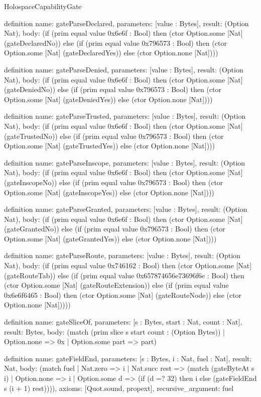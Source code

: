 \begin{lexlean}{HolospaceCapabilityGate}
\begin{semanticmodule}
definition{
  name: gateParseDeclared,
  parameters: [value : Bytes],
  result: (Option Nat),
  body: (if (prim equal value 0x6e6f : Bool) then (ctor Option.some [Nat] (gateDeclaredNo)) else (if (prim equal value 0x796573 : Bool) then (ctor Option.some [Nat] (gateDeclaredYes)) else (ctor Option.none [Nat])))
}

definition{
  name: gateParseDenied,
  parameters: [value : Bytes],
  result: (Option Nat),
  body: (if (prim equal value 0x6e6f : Bool) then (ctor Option.some [Nat] (gateDeniedNo)) else (if (prim equal value 0x796573 : Bool) then (ctor Option.some [Nat] (gateDeniedYes)) else (ctor Option.none [Nat])))
}

definition{
  name: gateParseTrusted,
  parameters: [value : Bytes],
  result: (Option Nat),
  body: (if (prim equal value 0x6e6f : Bool) then (ctor Option.some [Nat] (gateTrustedNo)) else (if (prim equal value 0x796573 : Bool) then (ctor Option.some [Nat] (gateTrustedYes)) else (ctor Option.none [Nat])))
}

definition{
  name: gateParseInscope,
  parameters: [value : Bytes],
  result: (Option Nat),
  body: (if (prim equal value 0x6e6f : Bool) then (ctor Option.some [Nat] (gateInscopeNo)) else (if (prim equal value 0x796573 : Bool) then (ctor Option.some [Nat] (gateInscopeYes)) else (ctor Option.none [Nat])))
}

definition{
  name: gateParseGranted,
  parameters: [value : Bytes],
  result: (Option Nat),
  body: (if (prim equal value 0x6e6f : Bool) then (ctor Option.some [Nat] (gateGrantedNo)) else (if (prim equal value 0x796573 : Bool) then (ctor Option.some [Nat] (gateGrantedYes)) else (ctor Option.none [Nat])))
}

definition{
  name: gateParseRoute,
  parameters: [value : Bytes],
  result: (Option Nat),
  body: (if (prim equal value 0x746162 : Bool) then (ctor Option.some [Nat] (gateRouteTab)) else (if (prim equal value 0x657874656e73696f6e : Bool) then (ctor Option.some [Nat] (gateRouteExtension)) else (if (prim equal value 0x6e6f6465 : Bool) then (ctor Option.some [Nat] (gateRouteNode)) else (ctor Option.none [Nat]))))
}

definition{
  name: gateSliceOf,
  parameters: [s : Bytes, start : Nat, count : Nat],
  result: Bytes,
  body: (match (prim slice s start count : (Option Bytes))
    | Option.none => 0x
    | Option.some part => part)
}

definition{
  name: gateFieldEnd,
  parameters: [s : Bytes, i : Nat, fuel : Nat],
  result: Nat,
  body: (match fuel
    | Nat.zero => i
    | Nat.succ rest => (match (gateByteAt s i)
      | Option.none => i
      | Option.some d => (if (d =? 32) then i else (gateFieldEnd s (i + 1) rest)))),
  axioms: [Quot.sound, propext],
  recursive_argument: fuel
}


\end{semanticmodule}
\end{lexlean}
